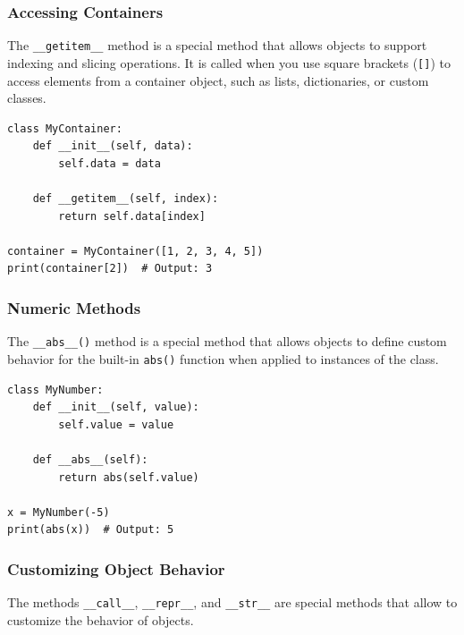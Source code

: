 \subsubsection{Accessing Containers}

The \texttt{\_\_getitem\_\_} method is a special method that allows objects to support indexing and slicing operations. It is called when you use square brackets (\texttt{[]}) to access elements from a container object, such as lists, dictionaries, or custom classes.

\begin{codebox}
\begin{verbatim}
class MyContainer:
    def __init__(self, data):
        self.data = data

    def __getitem__(self, index):
        return self.data[index]

container = MyContainer([1, 2, 3, 4, 5])
print(container[2])  # Output: 3
\end{verbatim}
\end{codebox}

\subsubsection{Numeric Methods}
The \texttt{\_\_abs\_\_()} method is a special method that allows objects to define custom behavior for the built-in \texttt{abs()} function when applied to instances of the class.

\begin{codebox}
\begin{verbatim}
class MyNumber:
    def __init__(self, value):
        self.value = value
    
    def __abs__(self):
        return abs(self.value)

x = MyNumber(-5)
print(abs(x))  # Output: 5
\end{verbatim}
\end{codebox}

\newpage
\subsubsection{Customizing Object Behavior}

The methods \texttt{\_\_call\_\_}, \texttt{\_\_repr\_\_}, and \texttt{\_\_str\_\_} are special methods that allow to customize the behavior of objects.

